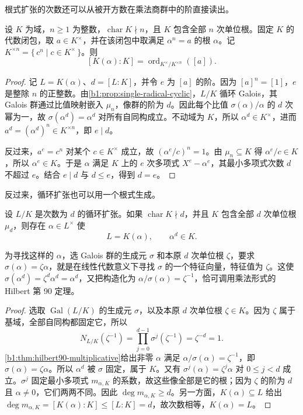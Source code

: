 \ProseParagraphBreak
根式扩张的次数还可以从被开方数在乘法商群中的阶直接读出。

\begin{corollary}\label{b1:cor:kummer-radical-degree}
	设 \(K\) 为域，\(n\geq1\) 为整数，\(\operatorname{char}K\nmid n\)，且 \(K\) 包含全部 \(n\) 次单位根。固定 \(K\) 的代数闭包，取 \(a\in K^\times\)，并在该闭包中取满足 \(\alpha^n=a\) 的根 \(\alpha\)。记 \(K^{\times n}=\{\,c^n\mid c\in K^\times\,\}\)。则
	\[
		[K(\alpha):K]=\operatorname{ord}_{K^\times/K^{\times n}}([a]).
	\]
\end{corollary}
\begin{proof}
	记 \(L=K(\alpha)\)、\(d=[L:K]\)，并令 \(e\) 为 \([a]\) 的阶。因为 \([a]^n=[1]\)，\(e\) 是整除 \(n\) 的正整数。由\cref{b1:prop:single-radical-cyclic}，\(L/K\) 循环 Galois，其 Galois 群通过比值映射嵌入 \(\mu_n\)，像群的阶为 \(d\)。因此每个比值 \(\sigma(\alpha)/\alpha\) 的 \(d\) 次幂为一，故 \(\sigma(\alpha^d)=\alpha^d\) 对所有自同构成立。不动域为 \(K\)，所以 \(\alpha^d\in K^\times\)，进而 \(a^d=(\alpha^d)^n\in K^{\times n}\)，即 \(e\mid d\)。

	反过来，\(a^e=c^n\) 对某个 \(c\in K^\times\) 成立，故 \((\alpha^e/c)^n=1\)。由 \(\mu_n\subseteq K\) 得 \(\alpha^e/c\in K\)，所以 \(\alpha^e\in K\)。于是 \(\alpha\) 满足 \(K\) 上的 \(e\) 次多项式 \(X^e-\alpha^e\)，其最小多项式次数 \(d\) 不超过 \(e\)。结合 \(e\mid d\) 与 \(d\le e\)，得到 \(d=e\)。
\end{proof}

反过来，循环扩张也可以用一个根式生成。

\begin{theorem}\label{b1:thm:kummer-cyclic}
	设 \(L/K\) 是次数为 \(d\) 的循环扩张。如果 \(\operatorname{char}K\nmid d\)，并且 \(K\) 包含全部 \(d\) 次单位根 \(\mu_d\)，则存在 \(\alpha\in L^\times\) 使
	\[
		L=K(\alpha),\qquad\alpha^d\in K.
	\]
\end{theorem}

为寻找这样的 \(\alpha\)，选 Galois 群的生成元 \(\sigma\) 和本原 \(d\) 次单位根 \(\zeta\)，要求 \(\sigma(\alpha)=\zeta\alpha\)，就是在线性代数意义下寻找 \(\sigma\) 的一个特征向量，特征值为 \(\zeta\)。这使 \(\sigma(\alpha^d)=\zeta^d\alpha^d=\alpha^d\)，又把构造化为 \(\alpha/\sigma(\alpha)=\zeta^{-1}\)，恰可调用乘法形式的 Hilbert 第 90 定理。

\begin{proof}
	选取 \(\operatorname{Gal}(L/K)\) 的生成元 \(\sigma\)，以及本原 \(d\) 次单位根 \(\zeta\in K\)。因为 \(\zeta\) 属于基域，全部自同构都固定它，所以
	\[
		N_{L/K}(\zeta^{-1})=\prod_{j=0}^{d-1}\sigma^j(\zeta^{-1}) =\zeta^{-d}=1.
	\]
	\cref{b1:thm:hilbert90-multiplicative}给出非零 \(\alpha\) 满足 \(\alpha/\sigma(\alpha)=\zeta^{-1}\)，即 \(\sigma(\alpha)=\zeta\alpha\)。所以 \(\alpha^d\) 被 \(\sigma\) 固定，属于 \(K\)。又有 \(\sigma^j(\alpha)=\zeta^j\alpha\) 对 \(0\le j<d\) 成立。\(\sigma^j\) 固定最小多项式 \(m_{\alpha,K}\) 的系数，故这些像全部是它的根；因为 \(\zeta\) 的阶为 \(d\) 且 \(\alpha\ne0\)，它们两两不同。因此 \(\deg m_{\alpha,K}\ge d\)。另一方面，\(K(\alpha)\subseteq L\) 给出 \(\deg m_{\alpha,K}=[K(\alpha):K]\le[L:K]=d\)，故次数相等，\(K(\alpha)=L\)。
\end{proof}

